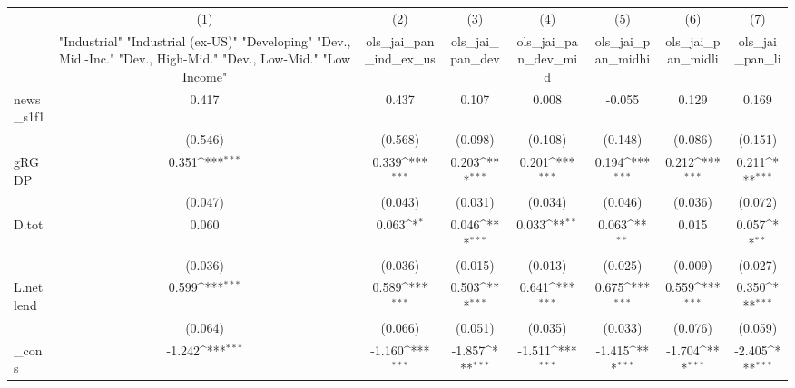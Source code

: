 {
\def\sym#1{\ifmmode^{#1}\else\(^{#1}\)\fi}
\begin{tabular}{l*{7}{c}}
\toprule
            &\multicolumn{1}{c}{(1)}&\multicolumn{1}{c}{(2)}&\multicolumn{1}{c}{(3)}&\multicolumn{1}{c}{(4)}&\multicolumn{1}{c}{(5)}&\multicolumn{1}{c}{(6)}&\multicolumn{1}{c}{(7)}\\
            &\multicolumn{1}{c}{ "Industrial" "Industrial (ex-US)" "Developing" "Dev., Mid.-Inc." "Dev., High-Mid."  "Dev., Low-Mid." "Low Income" }&\multicolumn{1}{c}{ols\_jai\_pan\_ind\_ex\_us}&\multicolumn{1}{c}{ols\_jai\_pan\_dev}&\multicolumn{1}{c}{ols\_jai\_pan\_dev\_mid}&\multicolumn{1}{c}{ols\_jai\_pan\_midhi}&\multicolumn{1}{c}{ols\_jai\_pan\_midli}&\multicolumn{1}{c}{ols\_jai\_pan\_li}\\
\midrule
news\_s1f1   &       0.417         &       0.437         &       0.107         &       0.008         &      -0.055         &       0.129         &       0.169         \\
            &     (0.546)         &     (0.568)         &     (0.098)         &     (0.108)         &     (0.148)         &     (0.086)         &     (0.151)         \\
\addlinespace
gRGDP       &       0.351\sym{***}&       0.339\sym{***}&       0.203\sym{***}&       0.201\sym{***}&       0.194\sym{***}&       0.212\sym{***}&       0.211\sym{***}\\
            &     (0.047)         &     (0.043)         &     (0.031)         &     (0.034)         &     (0.046)         &     (0.036)         &     (0.072)         \\
\addlinespace
D.tot       &       0.060         &       0.063\sym{*}  &       0.046\sym{***}&       0.033\sym{**} &       0.063\sym{**} &       0.015         &       0.057\sym{**} \\
            &     (0.036)         &     (0.036)         &     (0.015)         &     (0.013)         &     (0.025)         &     (0.009)         &     (0.027)         \\
\addlinespace
L.netlend   &       0.599\sym{***}&       0.589\sym{***}&       0.503\sym{***}&       0.641\sym{***}&       0.675\sym{***}&       0.559\sym{***}&       0.350\sym{***}\\
            &     (0.064)         &     (0.066)         &     (0.051)         &     (0.035)         &     (0.033)         &     (0.076)         &     (0.059)         \\
\addlinespace
\_cons      &      -1.242\sym{***}&      -1.160\sym{***}&      -1.857\sym{***}&      -1.511\sym{***}&      -1.415\sym{***}&      -1.704\sym{***}&      -2.405\sym{***}\\

\end{tabular}}
